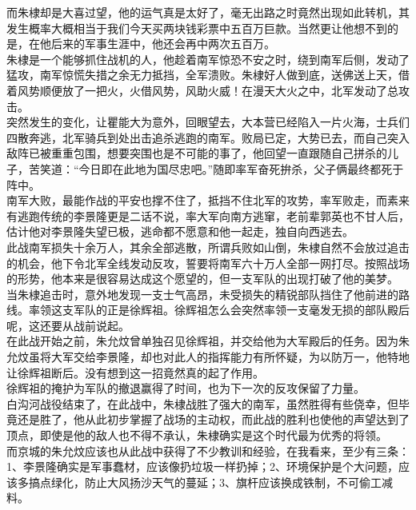 \begin{multicols}{\theparacolNo}
而朱棣却是大喜过望，他的运气真是太好了，毫无出路之时竟然出现如此转机，其发生概率大概相当于我们今天买两块钱彩票中五百万巨款。当然更让他想不到的是，在他后来的军事生涯中，他还会再中两次五百万。\\

朱棣是一个能够抓住战机的人，他趁着南军惊恐不安之时，绕到南军后侧，发动了猛攻，南军惊慌失措之余无力抵挡，全军溃败。朱棣好人做到底，送佛送上天，借着风势顺便放了一把火，火借风势，风助火威！在漫天大火之中，北军发动了总攻击。\\

突然发生的变化，让瞿能大为意外，回眼望去，大本营已经陷入一片火海，士兵们四散奔逃，北军骑兵到处出击追杀逃跑的南军。败局已定，大势已去，而自己突入敌阵已被重重包围，想要突围也是不可能的事了，他回望一直跟随自己拼杀的儿子，苦笑道：“今日即在此地为国尽忠吧。”随即率军奋死拚杀，父子俩最终都死于阵中。\\

南军大败，最能作战的平安也撑不住了，抵挡不住北军的攻势，率军败走，而素来有逃跑传统的李景隆更是二话不说，率大军向南方逃窜，老前辈郭英也不甘人后，估计他对李景隆失望已极，逃命都不愿意和他一起走，独自向西逃去。\\

此战南军损失十余万人，其余全部逃散，所谓兵败如山倒，朱棣自然不会放过追击的机会，他下令北军全线发动反攻，誓要将南军六十万人全部一网打尽。按照战场的形势，他本来是很容易达成这个愿望的，但一支军队的出现打破了他的美梦。\\

当朱棣追击时，意外地发现一支士气高昂，未受损失的精锐部队挡住了他前进的路线。率领这支军队的正是徐辉祖。徐辉祖怎么会突然率领一支毫发无损的部队殿后呢，这还要从战前说起。\\

在此战开始之前，朱允炆曾单独召见徐辉祖，并交给他为大军殿后的任务。因为朱允炆虽将大军交给李景隆，却也对此人的指挥能力有所怀疑，为以防万一，他特地让徐辉祖断后。没有想到这一招竟然真的起了作用。\\

徐辉祖的掩护为军队的撤退赢得了时间，也为下一次的反攻保留了力量。\\

白沟河战役结束了，在此战中，朱棣战胜了强大的南军，虽然胜得有些侥幸，但毕竟还是胜了，他从此初步掌握了战场的主动权，而此战的胜利也使他的声望达到了顶点，即使是他的敌人也不得不承认，朱棣确实是这个时代最为优秀的将领。\\

而京城的朱允炆应该也从此战中获得了不少教训和经验，在我看来，至少有三条：1、李景隆确实是军事蠢材，应该像扔垃圾一样扔掉；2、环境保护是个大问题，应该多搞点绿化，防止大风扬沙天气的蔓延；3、旗杆应该换成铁制，不可偷工减料。\\


\end{multicols}
